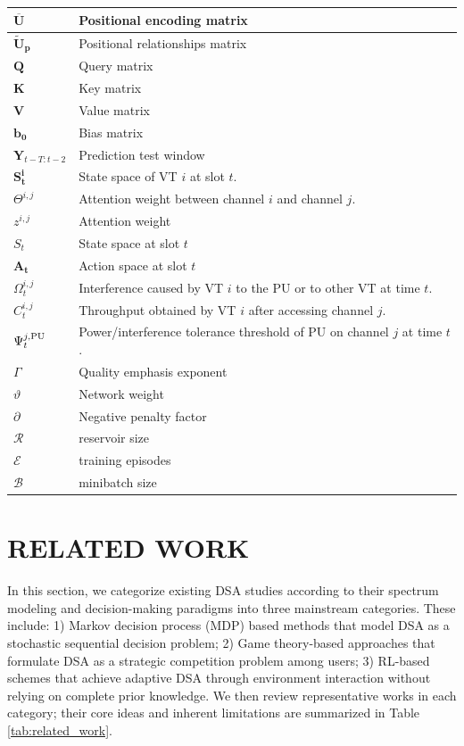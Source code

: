 \documentclass[journal]{IEEEtran}
\begin{document}
\begin{table}[t]
\begin{tabular}{|p{}|p{}|}
$\mathbf{\overline U}$ &  Positional encoding matrix          \\ \hline
$\mathbf{\tilde{U}_p}$  & Positional relationships matrix  \\ \hline
$\mathbf{Q}$            & Query matrix \\ \hline
$\mathbf{K}$         & Key matrix \\ \hline
$\mathbf{V}$     & Value matrix \\ \hline
$\mathbf{b_0}$   & Bias matrix \\ \hline
$\mathbf{Y}_{t-T:t-2}$ & Prediction test window \\ \hline
$\mathbf{S_t^{i}}$    & State space of VT $i$ at slot $t$. \\ \hline
$\Theta^{i,j}$       & Attention weight between channel $i$ and channel $j$.  \\ \hline
$z^{i,j}$             &Attention weight \\ \hline
$S_t$ & State space at slot $t$\\ \hline
$\mathbf{A_t}$ & Action space  at slot $t$\\ \hline
$\Omega _t^{i,j}$  &  Interference caused by VT $i$ to the PU or to other VT at time $t$. \\ \hline
$C_t^{i,j}$ &Throughput obtained by VT $i$ after accessing channel $j$.\\ \hline
$\Psi _t^{j, {\rm{PU}}}$ &Power/interference tolerance threshold of PU on
channel $j$ at time $t$. \\ \hline
 $\Gamma$  & Quality emphasis exponent \\ \hline
 $\vartheta$ &Network weight \\ \hline
 $\partial$  &Negative penalty factor\\ \hline
 $\mathcal{R}$ & reservoir size\\ \hline
 $\mathcal{E}$ &training episodes\\ \hline
 $\mathcal{B}$ &minibatch size\\ \hline
\end{tabular}
\end{table}
\section{RELATED WORK}
In this section, we categorize existing DSA studies according to their spectrum modeling and decision-making paradigms into three mainstream categories.
These include: 1)  Markov decision process (MDP) based methods that model DSA as a stochastic sequential decision problem; 2) Game theory-based approaches that formulate DSA as a strategic competition problem among users; 3) RL-based schemes that achieve adaptive DSA through environment interaction without relying on complete prior knowledge. We then review representative works in each category; their core ideas and inherent limitations are summarized in Table \ref{tab:related_work}.\par
\end{document}
